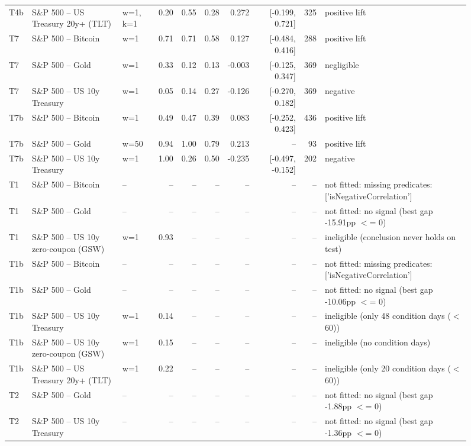 \begin{figure}
\begin{tabular}{lllrrrrrrl}
T4b & S\&P 500 -- US Treasury 20y+ (TLT) & w=1, k=1 & 0.20 & 0.55 & 0.28 & 0.272 & [-0.199, 0.721] & 325 & positive lift \\
T7 & S\&P 500 -- Bitcoin & w=1 & 0.71 & 0.71 & 0.58 & 0.127 & [-0.484, 0.416] & 288 & positive lift \\
T7 & S\&P 500 -- Gold & w=1 & 0.33 & 0.12 & 0.13 & -0.003 & [-0.125, 0.347] & 369 & negligible \\
T7 & S\&P 500 -- US 10y Treasury & w=1 & 0.05 & 0.14 & 0.27 & -0.126 & [-0.270, 0.182] & 369 & negative \\
T7b & S\&P 500 -- Bitcoin & w=1 & 0.49 & 0.47 & 0.39 & 0.083 & [-0.252, 0.423] & 436 & positive lift \\
T7b & S\&P 500 -- Gold & w=50 & 0.94 & 1.00 & 0.79 & 0.213 & -- & 93 & positive lift \\
T7b & S\&P 500 -- US 10y Treasury & w=1 & 1.00 & 0.26 & 0.50 & -0.235 & [-0.497, -0.152] & 202 & negative \\
T1 & S\&P 500 -- Bitcoin & -- & -- & -- & -- & -- & -- & -- & not fitted: missing predicates: ['isNegativeCorrelation'] \\
T1 & S\&P 500 -- Gold & -- & -- & -- & -- & -- & -- & -- & not fitted: no signal (best gap -15.91pp $<$= 0) \\
T1 & S\&P 500 -- US 10y zero-coupon (GSW) & w=1 & 0.93 & -- & -- & -- & -- & -- & ineligible (conclusion never holds on test) \\
T1b & S\&P 500 -- Bitcoin & -- & -- & -- & -- & -- & -- & -- & not fitted: missing predicates: ['isNegativeCorrelation'] \\
T1b & S\&P 500 -- Gold & -- & -- & -- & -- & -- & -- & -- & not fitted: no signal (best gap -10.06pp $<$= 0) \\
T1b & S\&P 500 -- US 10y Treasury & w=1 & 0.14 & -- & -- & -- & -- & -- & ineligible (only 48 condition days ($<$ 60)) \\
T1b & S\&P 500 -- US 10y zero-coupon (GSW) & w=1 & 0.15 & -- & -- & -- & -- & -- & ineligible (no condition days) \\
T1b & S\&P 500 -- US Treasury 20y+ (TLT) & w=1 & 0.22 & -- & -- & -- & -- & -- & ineligible (only 20 condition days ($<$ 60)) \\
T2 & S\&P 500 -- Gold & -- & -- & -- & -- & -- & -- & -- & not fitted: no signal (best gap -1.88pp $<$= 0) \\
T2 & S\&P 500 -- US 10y Treasury & -- & -- & -- & -- & -- & -- & -- & not fitted: no signal (best gap -1.36pp $<$= 0) \\

\end{tabular}
\end{figure}
